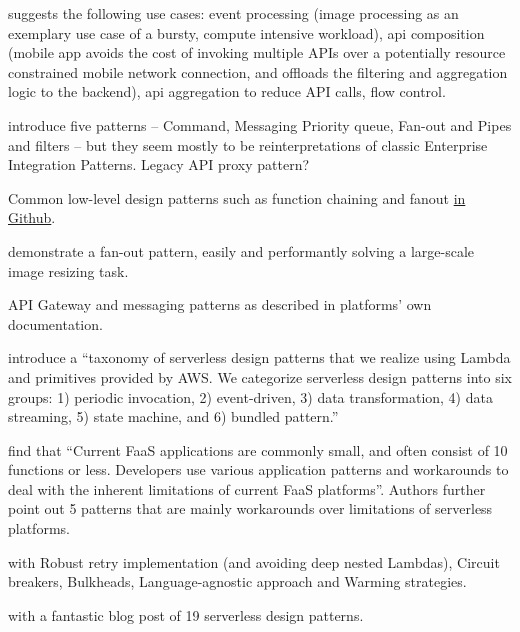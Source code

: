 \textcite{baldini17currentTrends} suggests the following use cases: event processing (image processing as an exemplary use case of a bursty, compute intensive workload), api composition (mobile app avoids the cost of invoking multiple APIs over a potentially resource constrained mobile network connection, and offloads the filtering and aggregation logic to the backend), api aggregation to reduce API calls, flow control.

\textcite{sbarski2017serverless} introduce five patterns -- Command, Messaging Priority queue, Fan-out and Pipes and filters -- but they seem mostly to be reinterpretations of classic Enterprise Integration Patterns. Legacy API proxy pattern?

Common low-level design patterns such as function chaining and fanout \href{https://github.com/yochay/serverlesspatterns}{in Github}.

\textcite{mcgrath16cloudEventParadigms} demonstrate a fan-out pattern, easily and performantly solving a large-scale image resizing task.

API Gateway and messaging patterns as described in platforms' own documentation. \parencite{awslambda0218}

\textcite{hong18securingviaserverlesspatterns} introduce a ``taxonomy of serverless design patterns that we realize using Lambda and primitives provided by AWS. We categorize serverless design patterns into six groups: 1) periodic invocation, 2) event-driven, 3) data transformation, 4) data streaming, 5) state machine, and 6) bundled pattern.''

\textcite{leitner18industrialpractice} find that ``Current FaaS applications are commonly small, and often consist of 10 functions or less. Developers use various application patterns and workarounds to deal with the inherent limitations of current FaaS platforms''. Authors further point out 5 patterns that are mainly workarounds over limitations of serverless platforms.

\textcite{bardsley18optimizationStrategies} with Robust retry implementation (and avoiding deep nested Lambdas), Circuit breakers, Bulkheads, Language-agnostic approach and Warming strategies.

\textcite{daly18blogPatterns} with a fantastic blog post of 19 serverless design patterns.

